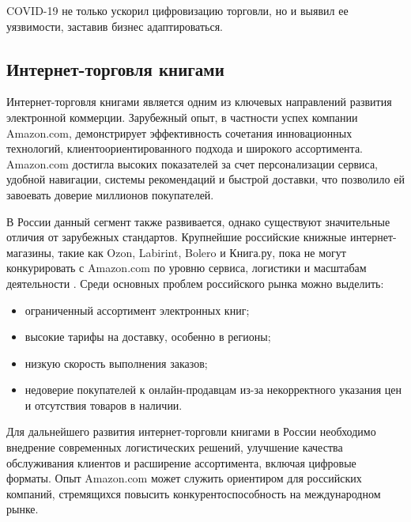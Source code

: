 COVID-19 не только ускорил цифровизацию торговли, но и выявил ее уязвимости, заставив бизнес адаптироваться.


\subsection{Интернет-торговля книгами}

Интернет-торговля книгами является одним из ключевых направлений развития электронной коммерции. Зарубежный опыт, в частности успех компании Amazon.com, демонстрирует эффективность сочетания инновационных технологий, клиентоориентированного подхода и широкого ассортимента. Amazon.com достигла высоких показателей за счет персонализации сервиса, удобной навигации, системы рекомендаций и быстрой доставки, что позволило ей завоевать доверие миллионов покупателей.

В России данный сегмент также развивается, однако существуют значительные отличия от зарубежных стандартов. Крупнейшие российские книжные интернет-магазины, такие как Ozon, Labirint, Bolero и Книга.ру, пока не могут конкурировать с Amazon.com по уровню сервиса, логистики и масштабам деятельности \cite{12}. Среди основных проблем российского рынка можно выделить:
\begin{itemize}
	\item ограниченный ассортимент электронных книг;
	\item высокие тарифы на доставку, особенно в регионы;
	\item низкую скорость выполнения заказов;
	\item недоверие покупателей к онлайн-продавцам из-за некорректного указания цен и отсутствия товаров в наличии.
\end{itemize}

Для дальнейшего развития интернет-торговли книгами в России необходимо внедрение современных логистических решений, улучшение качества обслуживания клиентов и расширение ассортимента, включая цифровые форматы. Опыт Amazon.com может служить ориентиром для российских компаний, стремящихся повысить конкурентоспособность на международном рынке.